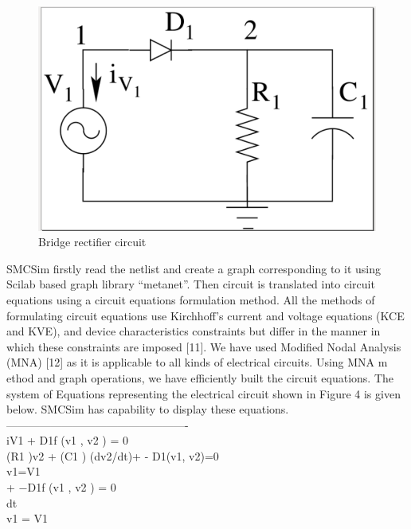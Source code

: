 \begin{figure}[h]%
\begin{center}
\includegraphics[width=1\linewidth]{figures/bridge-rectifier-circuit.png}%
\caption{Bridge rectifier circuit}
\label{br}
\end{center}
\end{figure}

SMCSim firstly read the netlist and create a graph corresponding to it using Scilab based graph library “metanet”. Then circuit is translated into circuit equations using a circuit equations formulation method. All the methods of formulating circuit equations use Kirchhoff’s current and voltage equations (KCE and KVE), and device characteristics constraints but differ in the manner in which these constraints are imposed [11]. We have used Modified Nodal Analysis (MNA) [12] as it is applicable to all kinds of electrical circuits. Using MNA m ethod and graph operations, we have efficiently built the circuit equations. The system of Equations representing the electrical circuit shown in Figure 4 is given below. SMCSim has capability to display these equations.\\

-------------------------------------------------\\
iV1 + D1f (v1 , v2 ) = 0 \\
(R1 )v2 + (C1 ) (dv2/dt)+ - D1(v1, v2)=0\\

v1=V1\\

 
+ −D1f (v1 , v2 ) = 0\\ 
dt \\
v1 = V1\\ 


